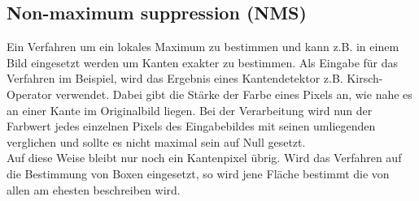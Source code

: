 \subsection{Non-maximum suppression  (NMS)}
Ein Verfahren um ein lokales Maximum zu bestimmen und kann z.B. in einem Bild eingesetzt werden um Kanten exakter zu bestimmen. Als Eingabe für das Verfahren im Beispiel, wird das Ergebnis eines Kantendetektor z.B. Kirsch-Operator verwendet. Dabei gibt die Stärke der Farbe eines Pixels an, wie nahe es an einer Kante im Originalbild liegen. Bei der Verarbeitung wird nun der Farbwert jedes einzelnen Pixels des Eingabebildes mit seinen umliegenden verglichen und sollte es nicht maximal sein auf Null gesetzt.\\
Auf diese Weise bleibt nur noch ein Kantenpixel übrig. Wird das Verfahren auf die Bestimmung von Boxen eingesetzt, so wird jene Fläche bestimmt die von allen am ehesten beschreiben wird.
\cite{wiki_Canny}\cite{NMS}